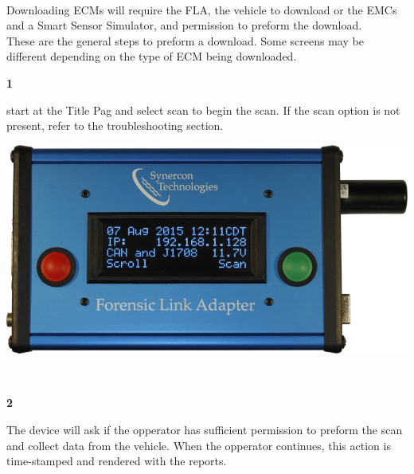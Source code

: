 \documentclass[11pt, oneside]{book}
\begin{document}
\paragraph{  }
Downloading ECMs will require the FLA, the vehicle to download or the EMCs and a Smart Sensor Simulator, and permission to preform the download.
\\
These are the general steps to preform a download. Some screens may be different depending on the type of ECM being downloaded.
\\[\baselineskip]
\noindent\begin{minipage}{0.45\textwidth}%
\begin{center}
\textbf{1}\\[\baselineskip]
\end{center}
start at the Title Pag and select scan to begin the scan. If the scan option is not present, refer to the troubleshooting section.
\end{minipage}%
\hfill%
\begin{minipage}{0.45\textwidth}
\includegraphics[width=\linewidth]{../media/fla_screens/ethernet_and_others/main/title_both}
\end{minipage}
\\[\baselineskip]\noindent\begin{minipage}{0.45\textwidth}%
\begin{center}
\textbf{2}\\[\baselineskip]
\end{center}
The device will ask if the opperator has sufficient permission to preform the scan and collect data from the vehicle. When the opperator continues, this action is time-stamped and rendered with the reports.
\end{minipage}%
\hfill%
\end{document}
